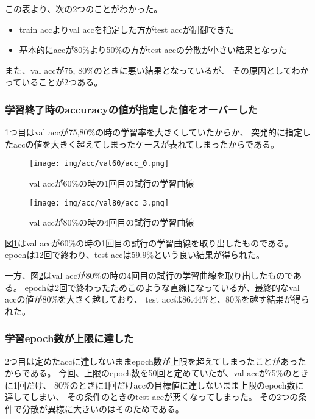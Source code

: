 \documentclass[12pt]{article}
\begin{document}
この表より、次の2つのことがわかった。

\begin{itemize}
    \item train accよりval accを指定した方がtest accが制御できた
    \item 基本的にaccが80\%より50\%の方がtest accの分散が小さい結果となった
\end{itemize}

また、val accが75, 80\%のときに悪い結果となっているが、
その原因としてわかっていることが2つある。

\subsubsection{学習終了時のaccuracyの値が指定した値をオーバーした}

1つ目はval accが75,80\%の時の学習率を大きくしていたからか、
突発的に指定したaccの値を大きく超えてしまったケースが表れてしまったからである。

\begin{figure}[H]
    \centering
    \texttt{[image: img/acc/val60/acc\_0.png]}
    \caption{val accが60\%の時の1回目の試行の学習曲線}
    \label{good_val}
\end{figure}

\begin{figure}[H]
    \centering
    \texttt{[image: img/acc/val80/acc\_3.png]}
    \caption{val accが80\%の時の4回目の試行の学習曲線}
    \label{bad_val}
\end{figure}

図\ref{good_val}はval accが60\%の時の1回目の試行の学習曲線を取り出したものである。
epochは12回で終わり、test accは59.9\%という良い結果が得られた。

一方、図\ref{bad_val}はval accが80\%の時の4回目の試行の学習曲線を取り出したものである。
epochは2回で終わったためこのような直線になっているが、最終的なval accの値が80\%を大きく越しており、
test accは86.44\%と、80\%を越す結果が得られた。

\subsubsection{学習epoch数が上限に達した}

2つ目は定めたaccに達しないままepoch数が上限を超えてしまったことがあったからである。
今回、上限のepoch数を50回と定めていたが、val accが75\%のときに1回だけ、
80\%のときに1回だけaccの目標値に達しないまま上限のepoch数に達してしまい、
その条件のときのtest accが悪くなってしまった。
その2つの条件で分散が異様に大きいのはそのためである。
\end{document}
